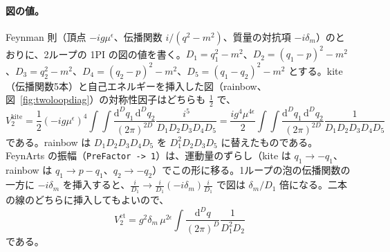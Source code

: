 \documentclass[a4paper,10pt]{ltjsarticle}
\newcommand{\dd}{\mathrm{d}}
\begin{document}
\paragraph{図の値。}Feynman 則（頂点 $-ig\mu^\epsilon$、伝播関数 $i/(q^2-m^2)$、質量の対抗項 $-i\delta_m$）のとおりに、2ループの 1PI の図の値を書く。$D_1=q_1^2-m^2$、$D_2=(q_1-p)^2-m^2$、$D_3=q_2^2-m^2$、$D_4=(q_2-p)^2-m^2$、$D_5=(q_1-q_2)^2-m^2$ とする。kite（伝播関数5本）と自己エネルギーを挿入した図（rainbow、図~\ref{fig:twoloopdiag}）の対称性因子はどちらも $\frac12$ で、
\begin{equation*}
V_2^{\mathrm{kite}}=\frac12(-ig\mu^\epsilon)^4\int\!\!\int\frac{\dd^Dq_1\,\dd^Dq_2}{(2\pi)^{2D}}\frac{i^5}{D_1D_2D_3D_4D_5}
=\frac{ig^4\mu^{4\epsilon}}2\int\!\!\int\frac{\dd^Dq_1\,\dd^Dq_2}{(2\pi)^{2D}}\frac{1}{D_1D_2D_3D_4D_5}
\end{equation*}
である。rainbow は $D_1D_2D_3D_4D_5$ を $D_1^2D_2D_3D_5$ に替えたものである。FeynArts の振幅（\texttt{PreFactor -> 1}）は、運動量のずらし（kite は $q_1\to-q_1$、rainbow は $q_1\to p-q_1$、$q_2\to-q_2$）でこの形に移る。1ループの泡の伝播関数の一方に $-i\delta_m$ を挿入すると、$\frac i{D_1}\to\frac i{D_1}(-i\delta_m)\frac i{D_1}$ で図は $\delta_m/D_1$ 倍になる。二本の線のどちらに挿入してもよいので、
\begin{equation*}
V_2^{\mathrm{ct}}=g^2\delta_m\,\mu^{2\epsilon}\int\frac{\dd^Dq}{(2\pi)^D}\frac1{D_1^2D_2}
\end{equation*}
である。
\end{document}
